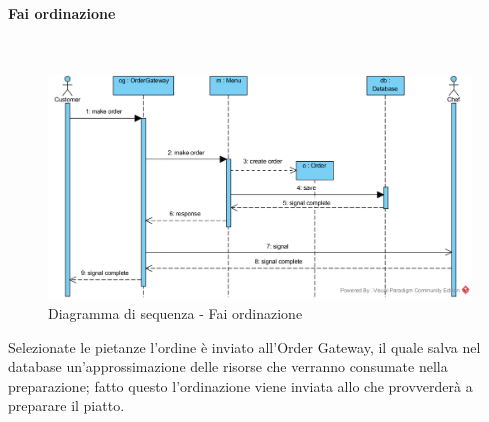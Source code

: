 \begin{samepage}
\paragraph{Fai ordinazione}\mbox{}\\
\end{samepage}
\begin{figure}[H]
	\centering
	\includegraphics[width=15cm]{../../documenti/SpecificaTecnica/diagrammi_img/sequenza/cliente_fai_ordinazione.png}
	\caption{Diagramma di sequenza - Fai ordinazione}
\end{figure}
Selezionate le pietanze l'ordine è inviato all'Order Gateway, il quale salva nel database un'approssimazione delle risorse che verranno consumate nella preparazione; fatto questo l'ordinazione viene inviata allo \Chef{} che provverderà a preparare il piatto.

\subsubsection{\Chef{}}


